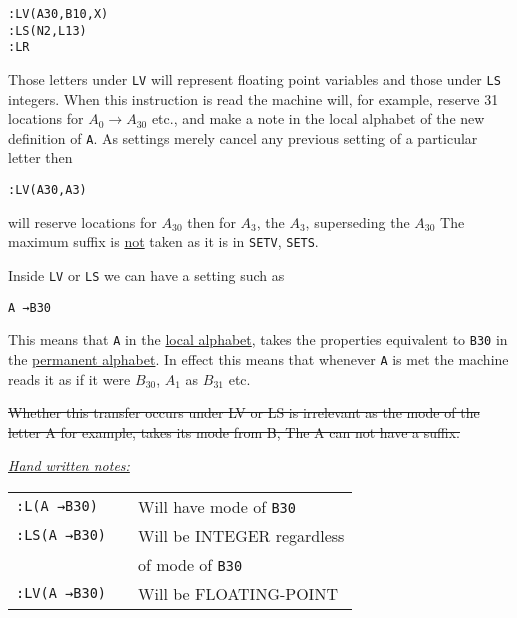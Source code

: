 \documentclass[10pt, a4paper, oneside]{article}
\newcommand{\myuline}[1]{\uline{#1}}
\newcommand{\mytt}[1]{\texttt{\scriptsize #1}}
\newcommand{\mytt}[1]{\texttt{\small #1}}
\begin{document}
\begin{multicols}{2}
\begin{addmargin}[1cm]{1em}%
\begin{lstlisting}
:LV(A30,B10,X)
:LS(N2,L13)
:LR
\end{lstlisting}
\end{addmargin}

Those letters under \mytt{LV} will represent floating
point variables and those under \mytt{LS} integers.  When
this instruction is read the machine will, for
example, reserve 31 locations for $A_{0} \rightarrow A_{30}$ etc., and
make a note in the local alphabet of the new
definition of \mytt{A}.  As settings merely cancel any
previous setting of a particular letter then

\begin{addmargin}[1cm]{1em}%
\begin{lstlisting}
:LV(A30,A3)
\end{lstlisting}
\end{addmargin}

will reserve locations for $A_{30}$ then for $A_{3}$, the $A_{3}$,
superseding the $A_{30}$ The maximum suffix is \myuline{not} taken
as it is in \mytt{SETV}, \mytt{SETS}.

Inside \mytt{LV} or \mytt{LS} we can have a setting such as

\begin{addmargin}[1cm]{1em}%
\begin{lstlisting}
A →B30
\end{lstlisting}
\end{addmargin}

This means that \mytt{A} in the \myuline{local alphabet}, takes the
properties equivalent to \mytt{B30} in the \myuline{permanent alphabet}.
In effect this means that whenever \mytt{A} is met the
machine reads it as if it were $B_{30}$, $A_{1}$ as $B_{31}$ etc.

\st{Whether this transfer occurs under LV or LS is
irrelevant as the mode of the letter A for example,
takes its mode from B, The A can not have a suffix.}

\begin{framed}
\vspace{-1em}
\begin{flushleft}
\myuline{\textit{Hand written notes:}}
\end{flushleft}

\begin{addmargin}[1em]{1em}%
\begin{tabular}{lp{0.5cm}l}
\mytt{:L(A →B30)}  & &  Will have mode of \mytt{B30} \\
\mytt{:LS(A →B30)} & & Will be INTEGER regardless   \\
                   & & \hspace{2em} of mode of \mytt{B30} \\
\mytt{:LV(A →B30)} & & Will be FLOATING-POINT       \\
\end{tabular}
\end{addmargin}
\end{framed}


\end{multicols}
\end{document}
